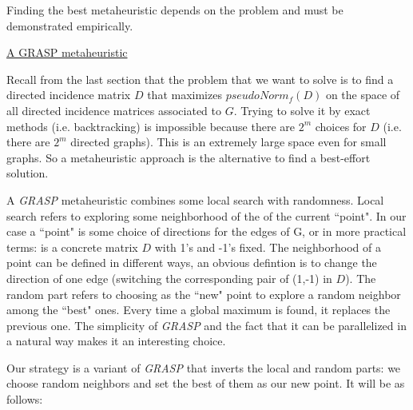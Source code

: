 \documentclass[a4paper,11pt]{article}
\begin{document}
Finding the best metaheuristic depends on the problem and must be 
demonstrated empirically.

\bigskip

\underline{A GRASP metaheuristic}

\bigskip

Recall from the last section that the problem that we want to solve is 
to find a directed incidence matrix $D$ that maximizes $pseudoNorm_f(D)$ 
on the space of all directed incidence matrices associated to $G$. 
Trying to solve it by exact methods (i.e. backtracking) is impossible 
because there are $2^m$ choices for $D$ (i.e. there are $2^m$ directed 
graphs). This is an extremely large space even for small graphs. So a 
metaheuristic approach is the alternative to find a best-effort 
solution.

\bigskip

A \textit{GRASP} metaheuristic combines some local search 
with randomness. Local search refers to exploring some neighborhood of 
the of the current ``point". In our case a ``point" is some choice of 
directions for the edges of G, or in more practical terms: is a 
concrete matrix $D$ with 1's and -1's fixed. The neighborhood of a 
point can be defined in different ways, an obvious defintion is to 
change the direction of one edge (switching the corresponding pair of 
(1,-1) in $D$). The random part refers to choosing as the ``new" point 
to explore a random neighbor among the ``best" ones. Every time a global 
maximum is found, it replaces the previous one. The simplicity of 
\textit{GRASP} and the fact that it can be parallelized in a natural 
way makes it an interesting choice.

\bigskip

Our strategy is a variant of \textit{GRASP} that inverts the local and 
random parts: we choose random neighbors and set the best of them as 
our new point. It will be as follows:
\end{document}
